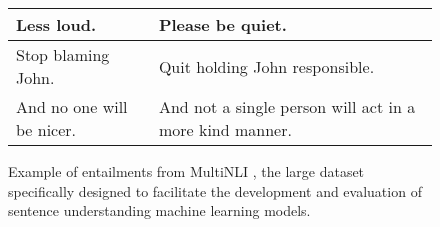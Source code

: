 \begin{figure*}[h]
\begin{center}
\begin{tabular}{ll}
 Less loud.   &  Please be quiet. \\
  \hline
Stop blaming John.  &    Quit holding John responsible. \\
 \hline
And no one will be nicer.   &    And not a single person will act in a more kind manner. \\
\end{tabular}
\caption{Example of entailments from MultiNLI \citep{williams-etal-2018-broad}, the large dataset specifically designed to facilitate the development and evaluation of sentence understanding machine learning models.}
\label{nli_examples}
\end{center}
\end{figure*}


